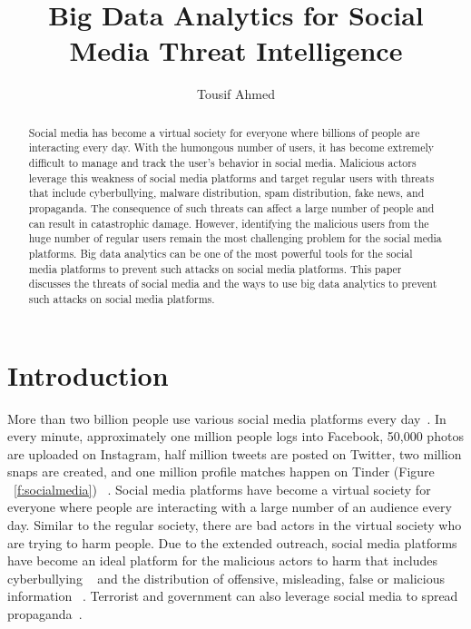 \documentclass[sigconf]{acmart}
\begin{document}
\title{Big Data Analytics for Social Media Threat Intelligence}


\author{Tousif Ahmed}



\begin{abstract}
Social media has become a virtual society for everyone where billions of people are interacting every day. With the humongous number of users, it has become extremely difficult to manage and track the user's behavior in social media.  Malicious actors leverage this weakness of social media platforms and target regular users with threats that include cyberbullying, malware distribution, spam distribution, fake news, and propaganda.  The consequence of such threats can affect a large number of people and can result in catastrophic damage. However, identifying the malicious users from the huge number of regular users remain the most challenging problem for the social media platforms. Big data analytics can be one of the most powerful tools for the social media platforms to prevent such attacks on social media platforms. This paper discusses the threats of social media and the ways to use big data analytics to prevent such attacks on social media platforms. 

\end{abstract}



\maketitle





\section{Introduction}
More than two billion people use various social media platforms every day~\cite{social-media}. In every minute, approximately one million people logs into Facebook, 50,000 photos are uploaded on Instagram, half million tweets are posted on Twitter, two million snaps are created, and one million profile matches happen on Tinder (Figure ~\ref{f:socialmedia}) ~\cite{social-media2}. Social media platforms have become a virtual society for everyone where people are interacting with a large number of an audience every day. Similar to the regular society, there are bad actors in the virtual society who are trying to harm people. Due to the extended outreach, social media platforms have become an ideal platform for the malicious actors to harm that includes cyberbullying ~\cite{Slonje:2013,Kwan:2013,Singh:2017,Cheng:2017,HosseinmardiMRH15} and the distribution of offensive, misleading, false or malicious information ~\cite{Menczer:2016, socialbots-CACM, Shao15hoaxy, Shao17hoaxybots}. Terrorist and government can also leverage social media to spread propaganda~\cite{Aro2016, Weimann:2006}.
\end{document}
